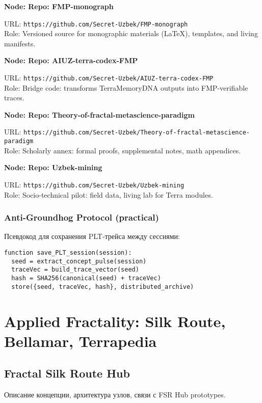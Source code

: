 \documentclass[11pt,oneside]{book}
\newenvironment{nodebox}[1]{%
  \vspace{6pt}
  \begin{framed}\noindent\textbf{Node: #1}\par\medskip\small\begingroup\setlength{\parindent}{0pt}\begin{minipage}{0.94\textwidth}\raggedright
}{%
  \end{minipage}\endgroup\end{framed}\vspace{6pt}
}
\begin{document}
\begin{nodebox}{Repo: FMP-monograph}
URL: \texttt{https://github.com/Secret-Uzbek/FMP-monograph}\\
Role: Versioned source for monographic materials (LaTeX), templates, and living manifests.
\end{nodebox}

\begin{nodebox}{Repo: AIUZ-terra-codex-FMP}
URL: \texttt{https://github.com/Secret-Uzbek/AIUZ-terra-codex-FMP}\\
Role: Bridge code: transforms TerraMemoryDNA outputs into FMP-verifiable traces.
\end{nodebox}

\begin{nodebox}{Repo: Theory-of-fractal-metascience-paradigm}
URL: \texttt{https://github.com/Secret-Uzbek/Theory-of-fractal-metascience-paradigm}\\
Role: Scholarly annex: formal proofs, supplemental notes, math appendices.
\end{nodebox}

\begin{nodebox}{Repo: Uzbek-mining}
URL: \texttt{https://github.com/Secret-Uzbek/Uzbek-mining}\\
Role: Socio-technical pilot: field data, living lab for Terra modules.
\end{nodebox}

\section{Anti-Groundhog Protocol (practical)}
Псевдокод для сохранения PLT-трейса между сессиями:
\begin{verbatim}
function save_PLT_session(session):
  seed = extract_concept_pulse(session)
  traceVec = build_trace_vector(seed)
  hash = SHA256(canonical(seed) + traceVec)
  store({seed, traceVec, hash}, distributed_archive)
\end{verbatim}

\part{Applied Fractality: Silk Route, Bellamar, Terrapedia}
\chapter{Fractal Silk Route Hub}
Описание концепции, архитектура узлов, связи с FSR Hub prototypes.
\end{document}

